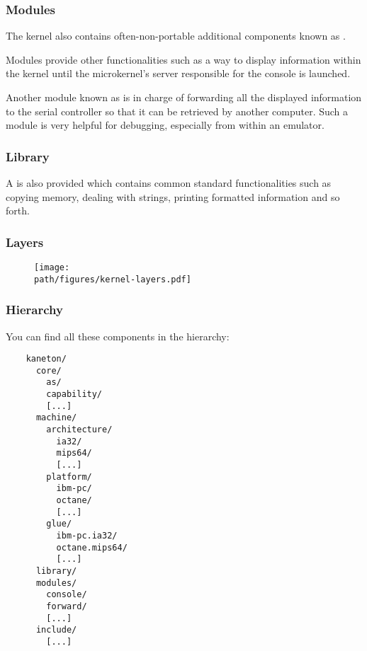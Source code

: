 
\begin{frame}
  \frametitle{Modules}

  The kernel also contains often-non-portable additional components known
  as .

  \-

  Modules provide other functionalities such as a way to display information
  within the kernel until the microkernel's server responsible for the
  console is launched.

  \-

  Another module known as  is in charge of forwarding all the
  displayed information to the serial controller so that it can be retrieved
  by another computer. Such a module is very helpful for debugging, especially
  from within an emulator.
\end{frame}


\begin{frame}
  \frametitle{Library}

  A  is also provided which contains common standard
  functionalities such as copying memory, dealing with strings, printing
  formatted information and so forth.
\end{frame}


\begin{frame}
  \frametitle{Layers}

  \begin{figure}[h]
    \begin{center}
      \texttt{[image: \\path/figures/kernel-layers.pdf]}
    \end{center}
  \end{figure}
\end{frame}


\begin{frame}[containsverbatim]
  \frametitle{Hierarchy}

  You can find all these components in the hierarchy:

  \begin{verbatim}
    kaneton/
      core/
        as/
        capability/
        [...]
      machine/
        architecture/
          ia32/
          mips64/
          [...]
        platform/
          ibm-pc/
          octane/
          [...]
        glue/
          ibm-pc.ia32/
          octane.mips64/
          [...]
      library/
      modules/
        console/
        forward/
        [...]
      include/
        [...]
  \end{verbatim}
\end{frame}

